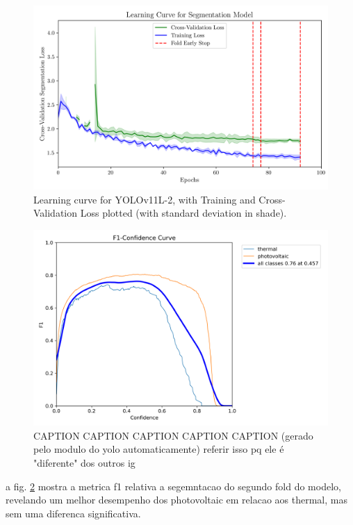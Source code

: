 \documentclass[conference]{IEEEtran}
\begin{document}
\begin{figure}[H]
    \centering
    \includegraphics[width=1\linewidth]{assets/model02_lc.png}
    \caption{Learning curve for YOLOv11L-2, with Training and Cross-Validation Loss plotted (with standard deviation in
shade).}
    \label{fig:model02_lc}
\end{figure}

\begin{figure}[H]
    \centering
    \includegraphics[width=1\linewidth]{assets/model02_yolof1.png}
    \caption{CAPTION CAPTION CAPTION CAPTION CAPTION (gerado pelo modulo do yolo automaticamente) referir isso pq ele é "diferente" dos outros ig}
    \label{fig:model02_yolof1}
\end{figure}

a fig. \ref{fig:model02_yolof1} mostra a metrica f1 relativa a segemntacao do segundo fold do modelo, revelando um melhor desempenho dos photovoltaic em relacao aos thermal, mas sem uma diferenca significativa.
\end{document}
